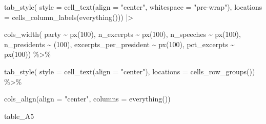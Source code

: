 \documentclass[
  man]{apa7}
\newenvironment{Shaded}{\begin{snugshade}}{\end{snugshade}}
\newcommand{\AttributeTok}[1]{\textcolor[rgb]{0.40,0.45,0.13}{#1}}
\newcommand{\DecValTok}[1]{\textcolor[rgb]{0.68,0.00,0.00}{#1}}
\newcommand{\FunctionTok}[1]{\textcolor[rgb]{0.28,0.35,0.67}{#1}}
\newcommand{\NormalTok}[1]{\textcolor[rgb]{0.00,0.23,0.31}{#1}}
\newcommand{\SpecialCharTok}[1]{\textcolor[rgb]{0.37,0.37,0.37}{#1}}
\newcommand{\StringTok}[1]{\textcolor[rgb]{0.13,0.47,0.30}{#1}}
\begin{document}
\begin{Shaded}
\begin{Highlighting}[]
  \FunctionTok{tab\_style}\NormalTok{(}
    \AttributeTok{style =} \FunctionTok{cell\_text}\NormalTok{(}\AttributeTok{align =} \StringTok{"center"}\NormalTok{, }\AttributeTok{whitespace =} \StringTok{"pre{-}wrap"}\NormalTok{),}
    \AttributeTok{locations =} \FunctionTok{cells\_column\_labels}\NormalTok{(}\FunctionTok{everything}\NormalTok{())) }\SpecialCharTok{|\textgreater{}}
  
  \FunctionTok{cols\_width}\NormalTok{(}
\NormalTok{    party }\SpecialCharTok{\textasciitilde{}} \FunctionTok{px}\NormalTok{(}\DecValTok{100}\NormalTok{),}
\NormalTok{    n\_excerpts }\SpecialCharTok{\textasciitilde{}} \FunctionTok{px}\NormalTok{(}\DecValTok{100}\NormalTok{),}
\NormalTok{    n\_speeches }\SpecialCharTok{\textasciitilde{}} \FunctionTok{px}\NormalTok{(}\DecValTok{100}\NormalTok{),}
\NormalTok{    n\_presidents }\SpecialCharTok{\textasciitilde{}}\NormalTok{ (}\DecValTok{100}\NormalTok{), }
\NormalTok{    excerpts\_per\_president }\SpecialCharTok{\textasciitilde{}} \FunctionTok{px}\NormalTok{(}\DecValTok{100}\NormalTok{),}
\NormalTok{    pct\_excerpts }\SpecialCharTok{\textasciitilde{}} \FunctionTok{px}\NormalTok{(}\DecValTok{100}\NormalTok{)) }\SpecialCharTok{\%\textgreater{}\%}
    
  \FunctionTok{tab\_style}\NormalTok{(}
    \AttributeTok{style =} \FunctionTok{cell\_text}\NormalTok{(}\AttributeTok{align =} \StringTok{"center"}\NormalTok{),}
    \AttributeTok{locations =} \FunctionTok{cells\_row\_groups}\NormalTok{()) }\SpecialCharTok{\%\textgreater{}\%}
  
  \FunctionTok{cols\_align}\NormalTok{(}\AttributeTok{align =} \StringTok{"center"}\NormalTok{, }\AttributeTok{columns =} \FunctionTok{everything}\NormalTok{())}


\NormalTok{table\_A5}
\end{Highlighting}
\end{Shaded}
\end{document}
